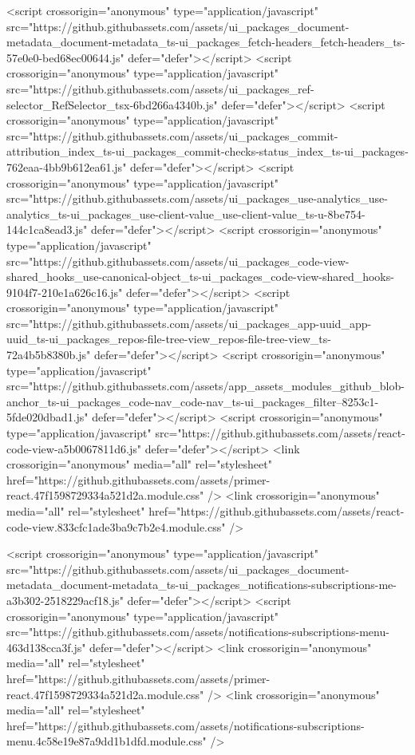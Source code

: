 <script crossorigin="anonymous" type="application/javascript" src="https://github.githubassets.com/assets/ui_packages_document-metadata_document-metadata_ts-ui_packages_fetch-headers_fetch-headers_ts-57e0e0-bed68ec00644.js" defer="defer"></script>
<script crossorigin="anonymous" type="application/javascript" src="https://github.githubassets.com/assets/ui_packages_ref-selector_RefSelector_tsx-6bd266a4340b.js" defer="defer"></script>
<script crossorigin="anonymous" type="application/javascript" src="https://github.githubassets.com/assets/ui_packages_commit-attribution_index_ts-ui_packages_commit-checks-status_index_ts-ui_packages-762eaa-4bb9b612ea61.js" defer="defer"></script>
<script crossorigin="anonymous" type="application/javascript" src="https://github.githubassets.com/assets/ui_packages_use-analytics_use-analytics_ts-ui_packages_use-client-value_use-client-value_ts-u-8be754-144c1ca8ead3.js" defer="defer"></script>
<script crossorigin="anonymous" type="application/javascript" src="https://github.githubassets.com/assets/ui_packages_code-view-shared_hooks_use-canonical-object_ts-ui_packages_code-view-shared_hooks-9104f7-210e1a626c16.js" defer="defer"></script>
<script crossorigin="anonymous" type="application/javascript" src="https://github.githubassets.com/assets/ui_packages_app-uuid_app-uuid_ts-ui_packages_repos-file-tree-view_repos-file-tree-view_ts-72a4b5b8380b.js" defer="defer"></script>
<script crossorigin="anonymous" type="application/javascript" src="https://github.githubassets.com/assets/app_assets_modules_github_blob-anchor_ts-ui_packages_code-nav_code-nav_ts-ui_packages_filter--8253c1-5fde020dbad1.js" defer="defer"></script>
<script crossorigin="anonymous" type="application/javascript" src="https://github.githubassets.com/assets/react-code-view-a5b0067811d6.js" defer="defer"></script>
<link crossorigin="anonymous" media="all" rel="stylesheet" href="https://github.githubassets.com/assets/primer-react.47f1598729334a521d2a.module.css" />
<link crossorigin="anonymous" media="all" rel="stylesheet" href="https://github.githubassets.com/assets/react-code-view.833cfc1ade3ba9c7b2e4.module.css" />

  <script crossorigin="anonymous" type="application/javascript" src="https://github.githubassets.com/assets/ui_packages_document-metadata_document-metadata_ts-ui_packages_notifications-subscriptions-me-a3b302-2518229acf18.js" defer="defer"></script>
<script crossorigin="anonymous" type="application/javascript" src="https://github.githubassets.com/assets/notifications-subscriptions-menu-463d138cca3f.js" defer="defer"></script>
<link crossorigin="anonymous" media="all" rel="stylesheet" href="https://github.githubassets.com/assets/primer-react.47f1598729334a521d2a.module.css" />
<link crossorigin="anonymous" media="all" rel="stylesheet" href="https://github.githubassets.com/assets/notifications-subscriptions-menu.4c58e19e87a9dd1b1dfd.module.css" />


